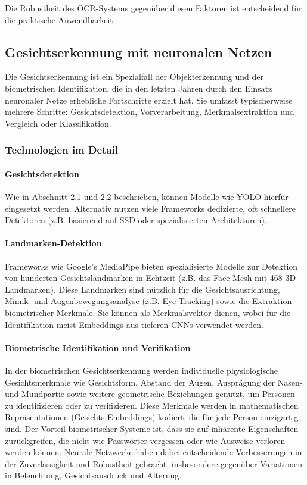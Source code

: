 Die Robustheit des OCR-Systems gegenüber diesen Faktoren ist entscheidend für die praktische Anwendbarkeit.

\subsection{Gesichtserkennung mit neuronalen Netzen}

Die Gesichtserkennung ist ein Spezialfall der Objekterkennung und der biometrischen Identifikation, die in den letzten Jahren durch den Einsatz neuronaler Netze erhebliche Fortschritte erzielt hat. Sie umfasst typischerweise mehrere Schritte: Gesichtsdetektion, Vorverarbeitung, Merkmalsextraktion und Vergleich oder Klassifikation.

\subsubsection{Technologien im Detail}

\paragraph{Gesichtsdetektion} 
Wie in Abschnitt 2.1 und 2.2 beschrieben, können Modelle wie YOLO hierfür eingesetzt werden. Alternativ nutzen viele Frameworks dedizierte, oft schnellere Detektoren (z.B. basierend auf SSD oder spezialisierten Architekturen).

\paragraph{Landmarken-Detektion} 
Frameworks wie Google's MediaPipe bieten spezialisierte Modelle zur Detektion von hunderten Gesichtslandmarken in Echtzeit (z.B. das Face Mesh mit 468 3D-Landmarken). Diese Landmarken sind nützlich für die Gesichtsausrichtung, Mimik- und Augenbewegungsanalyse (z.B. Eye Tracking) sowie die Extraktion biometrischer Merkmale. Sie können als Merkmalsvektor dienen, wobei für die Identifikation meist Embeddings aus tieferen CNNs verwendet werden.

\paragraph{Biometrische Identifikation und Verifikation}
In der biometrischen Gesichtserkennung werden individuelle physiologische Gesichtsmerkmale wie Gesichtsform, Abstand der Augen, Ausprägung der Nasen- und Mundpartie sowie weitere geometrische Beziehungen genutzt, um Personen zu identifizieren oder zu verifizieren. Diese Merkmale werden in mathematischen Repräsentationen (Gesichts-Embeddings) kodiert, die für jede Person einzigartig sind. Der Vorteil biometrischer Systeme ist, dass sie auf inhärente Eigenschaften zurückgreifen, die nicht wie Passwörter vergessen oder wie Ausweise verloren werden können. Neurale Netzwerke haben dabei entscheidende Verbesserungen in der Zuverlässigkeit und Robustheit gebracht, insbesondere gegenüber Variationen in Beleuchtung, Gesichtsausdruck und Alterung.

